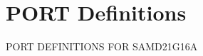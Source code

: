 \hypertarget{group___s_a_m_d21_g16_a__port}{}\section{P\+O\+RT Definitions}
\label{group___s_a_m_d21_g16_a__port}
P\+O\+RT D\+E\+F\+I\+N\+I\+T\+I\+O\+NS F\+OR S\+A\+M\+D21\+G16A 